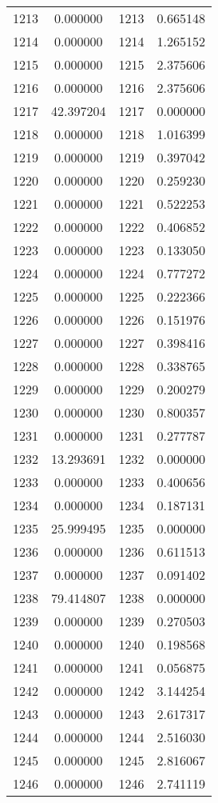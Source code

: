 \documentclass[12pt]{article}
\begin{document}
\begin{longtable}{@{}cccc@{}}
1213 & 0.000000 & 1213 & 0.665148 \\
1214 & 0.000000 & 1214 & 1.265152 \\
1215 & 0.000000 & 1215 & 2.375606 \\
1216 & 0.000000 & 1216 & 2.375606 \\
1217 & 42.397204 & 1217 & 0.000000 \\
1218 & 0.000000 & 1218 & 1.016399 \\
1219 & 0.000000 & 1219 & 0.397042 \\
1220 & 0.000000 & 1220 & 0.259230 \\
1221 & 0.000000 & 1221 & 0.522253 \\
1222 & 0.000000 & 1222 & 0.406852 \\
1223 & 0.000000 & 1223 & 0.133050 \\
1224 & 0.000000 & 1224 & 0.777272 \\
1225 & 0.000000 & 1225 & 0.222366 \\
1226 & 0.000000 & 1226 & 0.151976 \\
1227 & 0.000000 & 1227 & 0.398416 \\
1228 & 0.000000 & 1228 & 0.338765 \\
1229 & 0.000000 & 1229 & 0.200279 \\
1230 & 0.000000 & 1230 & 0.800357 \\
1231 & 0.000000 & 1231 & 0.277787 \\
1232 & 13.293691 & 1232 & 0.000000 \\
1233 & 0.000000 & 1233 & 0.400656 \\
1234 & 0.000000 & 1234 & 0.187131 \\
1235 & 25.999495 & 1235 & 0.000000 \\
1236 & 0.000000 & 1236 & 0.611513 \\
1237 & 0.000000 & 1237 & 0.091402 \\
1238 & 79.414807 & 1238 & 0.000000 \\
1239 & 0.000000 & 1239 & 0.270503 \\
1240 & 0.000000 & 1240 & 0.198568 \\
1241 & 0.000000 & 1241 & 0.056875 \\
1242 & 0.000000 & 1242 & 3.144254 \\
1243 & 0.000000 & 1243 & 2.617317 \\
1244 & 0.000000 & 1244 & 2.516030 \\
1245 & 0.000000 & 1245 & 2.816067 \\
1246 & 0.000000 & 1246 & 2.741119 \\

\end{longtable}
\end{document}
